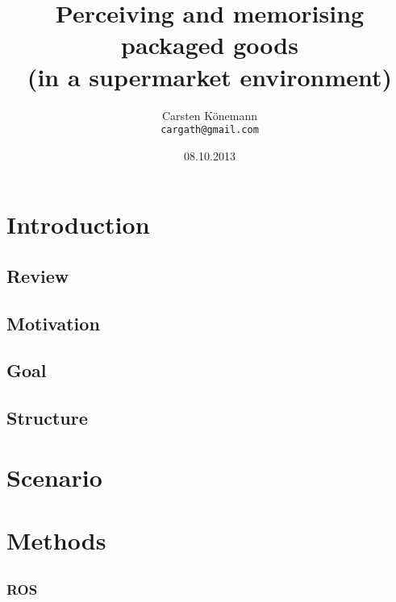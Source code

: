 \documentclass[11pt, twoside, a4paper]{report}
\begin{document}
\title{Perceiving and memorising packaged goods \\ (in a supermarket environment)}
\author{Carsten K\"onemann \\ \texttt{cargath@gmail.com}}
\date{08.10.2013}

\maketitle



\tableofcontents

\chapter{Introduction}

\section{Review}

\section{Motivation}

\section{Goal}

\section{Structure}


\chapter{Scenario}


\chapter{Methods}

\section{}
\subsection{ROS}
\end{document}
